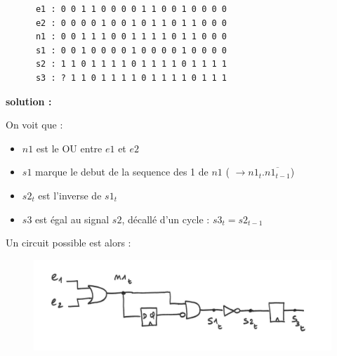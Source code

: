 \documentclass[a4paper,11pt]{article}
\begin{document}
\begin{verbatim}
      e1 : 0 0 1 1 0 0 0 0 1 1 0 0 1 0 0 0 0
      e2 : 0 0 0 0 1 0 0 1 0 1 1 0 1 1 0 0 0
      n1 : 0 0 1 1 1 0 0 1 1 1 1 0 1 1 0 0 0
      s1 : 0 0 1 0 0 0 0 1 0 0 0 0 1 0 0 0 0
      s2 : 1 1 0 1 1 1 1 0 1 1 1 1 0 1 1 1 1
      s3 : ? 1 1 0 1 1 1 1 0 1 1 1 1 0 1 1 1
\end{verbatim}


{\bf solution :}

On voit que :
\begin{itemize}
\item $n1$ est le OU entre $e1$ et $e2$
\item $s1$ marque le debut de la sequence des 1 de $n1$ ( $\rightarrow n1_t.\overline{n1_{t-1}}$)
\item $s2_t$ est l'inverse de $s1_t$
\item $s3$ est égal au signal $s2$, décallé d'un cycle : $s3_t=s2_{t-1}$
\end{itemize}

Un circuit possible est alors :
\begin{figure}[!h]
\begin{center}
\includegraphics[scale=0.3]{./figures/exo5-circuit.png}
\end{center}
\end{figure}
\end{document}
